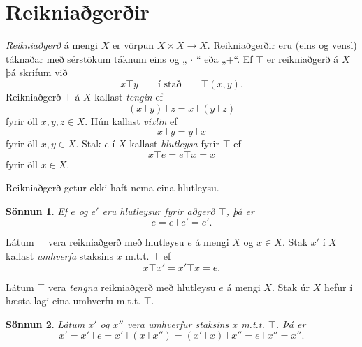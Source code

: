 \documentclass[a4paper,icelandic,11pt]{book}
\theoremstyle{plain}
\newtheorem*{sonnun}{Sönnun}
\begin{document}
\section{Reikniaðgerðir}
\begin{skilgr}
  \emph{Reikniaðgerð}
  á mengi $X$ er vörpun $X\times X \to X$. Reikniaðgerðir
  eru (eins og vensl) táknaðar með sérstökum táknum eins og „ $\cdot$ “ eða
  „$+$“. Ef $\top$ er reikniaðgerð á $X$ þá skrifum við
  \[ x\top y \qquad \text{í stað} \qquad \top(x,y) . \]
  Reikniaðgerð $\top$ á $X$ kallast
  \emph{tengin}
  ef
  \[ (x\top y)\top z = x\top (y\top z) \]
  fyrir öll $x,y,z \in X$. Hún kallast 
  \emph{víxlin}
  ef
  \[ x\top y = y\top x \]
  fyrir öll $x,y \in X$. Stak $e$ í $X$ kallast
  \emph{hlutleysa} fyrir $\top$ ef
  \[ x\top e = e\top x = x \]
  fyrir öll $x\in X$.
\end{skilgr}
\begin{setn}
  Reikniaðgerð getur ekki haft nema eina hlutleysu.
\end{setn}
\begin{sonnun}
  Ef $e$ og $e'$ eru hlutleysur fyrir aðgerð $\top$, þá er \[ e = e\top e' = e'. \]
\end{sonnun}
\begin{skilgr}
  Látum $\top$ vera reikniaðgerð með hlutleysu $e$ á mengi $X$ og $x\in X$.
  Stak $x'$ í $X$ kallast \emph{umhverfa} staksins $x$ m.t.t.
  $\top$ ef
  \[ x\top x' = x'\top x = e . \]
\end{skilgr}
\begin{setn}
  Látum $\top$ vera \emph{tengna} reikniaðgerð með hlutleysu $e$ á mengi $X$.
  Stak úr $X$ hefur í hæsta lagi eina umhverfu m.t.t. $\top$.
\end{setn}
\begin{sonnun}
  Látum $x'$ og $x''$ vera umhverfur staksins $x$ m.t.t. $\top$. Þá er
  \[ x' = x'\top e = x'\top (x\top x'') = (x' \top x) \top x'' = e\top x'' = x''. \]
\end{sonnun}
\end{document}

